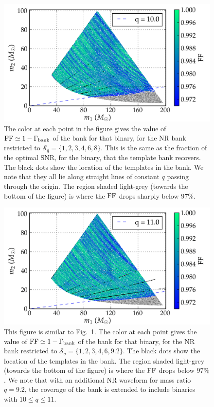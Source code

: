 \begin{figure}
\centering
\includegraphics[width=\columnwidth]{bank002_01_01_mtot200_match_cropped-tiny.png}
\caption{The color at each point in the figure gives the
value of $\mathrm{FF}\simeq 1-\Gamma_{\mathrm{bank}}$ of the bank for that binary, for
the NR bank restricted to $\mathcal{S}_q=\{1,2,3,4,6,8\}$. This is the
same as the fraction of the optimal SNR, for the binary, that the
template bank recovers. The black dots show
the location of the templates in the bank. We note that they all lie
along straight lines of constant $q$ passing through the origin. The region 
shaded light-grey (towards the bottom of the figure) is where the $\mathrm{FF}$ 
drops sharply below $97\%$.}
\label{fig:bank001_01_match}
\end{figure}
\begin{figure}
\centering
\includegraphics[width=\columnwidth]{bank006_01_mtot200_match_cropped-tiny.png}
\caption{This figure is similar to Fig.~\ref{fig:bank001_01_match}.
The color at each point gives the value of 
$\mathrm{FF}\simeq 1-\Gamma_{\mathrm{bank}}$ of the bank for that binary, for
the NR bank restricted to $\mathcal{S}_q=\{1,2,3,4,6,9.2\}$.
The black dots show the location of the templates in the bank. 
The region shaded light-grey (towards the bottom of the figure) is 
where the $\mathrm{FF}$ drops below $97\%$. We note that with an additional
NR waveform for mass ratio $q=9.2$, the coverage of the bank is 
extended to include binaries with $10\leq q\leq 11$.}
\label{fig:bank006_01_match}
\end{figure}
